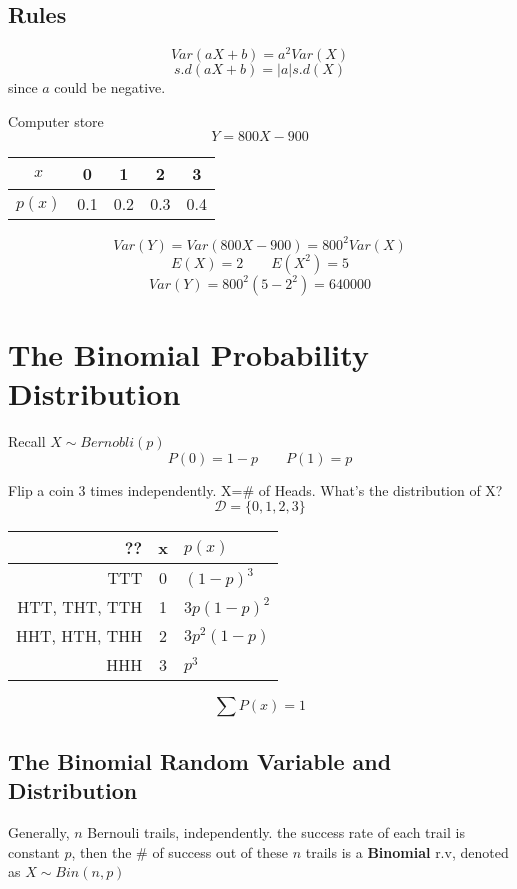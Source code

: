 \subsection{Rules}
\begin{prop}
\[Var(aX+b)=a^2 Var(X)\]
\[s.d(aX+b)=|a| s.d(X)\]
since $a$ could be negative.
\end{prop}

\begin{exmp}
Computer store
\[Y=800X-900\]

\begin{center}
\begin{tabular}{c|cccc}
\hline
$x$ & 0 & 1 & 2 & 3 \\
\hline
$p(x)$  & 0.1 & 0.2  & 0.3  & 0.4 \\
\hline
\end{tabular}
\end{center}

\[Var(Y)=Var(800X-900)=800^2 Var(X)\]
\[E(X)=2 \qquad E(X^2)=5\]
\[Var(Y)=800^2(5-2^2)=640000\]
\end{exmp}


\section{The Binomial Probability Distribution}
Recall $X \sim Bernobli(p)$
\[P(0)=1-p \qquad P(1)=p\]

\begin{exmp}
Flip a coin 3 times independently. 
X=\# of Heads. What's the distribution of X?
\[\mathcal{D}=\{0,1,2,3\}\]
\begin{center}
\begin{tabular}{r|c|l}
\hline
    ??  &  x  & $p(x)$ \\
    \hline
    TTT & 0 & $(1-p)^3$ \\
    HTT, THT, TTH  & 1 & $3p(1-p)^2$ \\
    HHT, HTH, THH  & 2 & $3p^2 (1-p)$ \\
    HHH & 3 & $p^3$ \\
\hline
\end{tabular}
\[\sum P(x)=1\] 
\end{center}


\end{exmp}

\subsection{The Binomial Random Variable and Distribution}
Generally, $n$ Bernouli trails, independently. the success rate of each trail is constant $p$, then the \# of success out of these $n$ trails is a \textbf{Binomial} r.v, denoted as $X \sim Bin(n,p)$

